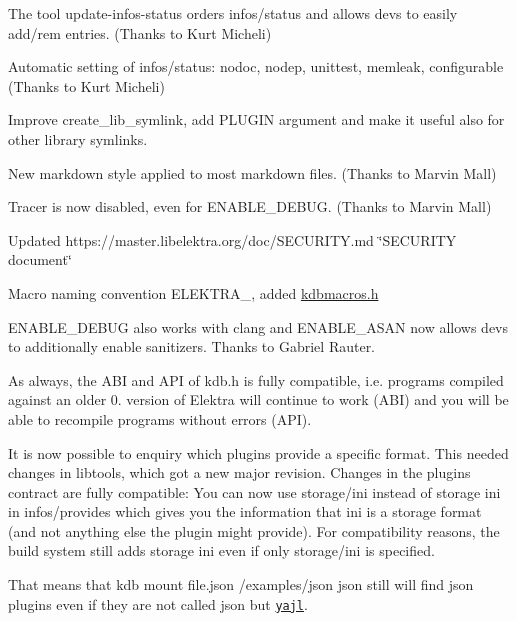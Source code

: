 \begin{DoxyItemize}
\item The tool {\ttfamily update-\/infos-\/status} orders {\ttfamily infos/status} and allows devs to easily add/rem entries. (Thanks to Kurt Micheli)
\item Automatic setting of {\ttfamily infos/status}\+: {\ttfamily nodoc}, {\ttfamily nodep}, {\ttfamily unittest}, {\ttfamily memleak}, {\ttfamily configurable} (Thanks to Kurt Micheli)
\item Improve {\ttfamily create\+\_\+lib\+\_\+symlink}, add {\ttfamily P\+L\+U\+G\+IN} argument and make it useful also for other library symlinks.
\item New markdown style applied to most markdown files. (Thanks to Marvin Mall)
\item Tracer is now disabled, even for {\ttfamily E\+N\+A\+B\+L\+E\+\_\+\+D\+E\+B\+UG}. (Thanks to Marvin Mall)
\item Updated https\+://master.libelektra.\+org/doc/\+S\+E\+C\+U\+R\+I\+TY.md \char`\"{}\+S\+E\+C\+U\+R\+I\+T\+Y document\char`\"{}
\item Macro naming convention {\ttfamily E\+L\+E\+K\+T\+R\+A\+\_\+}, added {\ttfamily \hyperlink{kdbmacros_8h}{kdbmacros.\+h}}
\item {\ttfamily E\+N\+A\+B\+L\+E\+\_\+\+D\+E\+B\+UG} also works with {\ttfamily clang} and {\ttfamily E\+N\+A\+B\+L\+E\+\_\+\+A\+S\+AN} now allows devs to additionally enable sanitizers. Thanks to Gabriel Rauter.
\end{DoxyItemize}

As always, the A\+BI and A\+PI of kdb.\+h is fully compatible, i.\+e. programs compiled against an older 0. version of Elektra will continue to work (A\+BI) and you will be able to recompile programs without errors (A\+PI).

It is now possible to enquiry which plugins provide a specific format. This needed changes in libtools, which got a new major revision. Changes in the plugin\textquotesingle{}s contract are fully compatible\+: You can now use {\ttfamily storage/ini} instead of {\ttfamily storage ini} in {\ttfamily infos/provides} which gives you the information that {\ttfamily ini} is a storage format (and not anything else the plugin might provide). For compatibility reasons, the build system still adds {\ttfamily storage ini} even if only {\ttfamily storage/ini} is specified.

That means that {\ttfamily kdb mount file.\+json /examples/json json} still will find {\ttfamily json} plugins even if they are not called {\ttfamily json} but \href{https://master.libelektra.org/src/plugins/yajl}{\tt yajl}.

